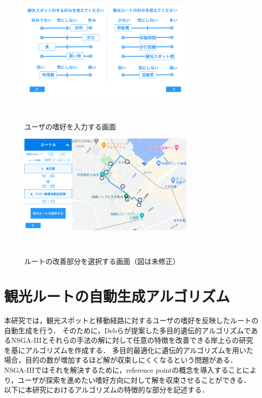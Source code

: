 \begin{figure}[h]
  \begin{center}
  \includegraphics[width=8.5cm,bb=0 0 1980 1080]{sysimage2.png}
  \end{center}
  \caption{ユーザの嗜好を入力する画面}　
  \label{fig:ユーザの嗜好を入力する画面}
\end{figure}

\begin{figure}[h]
  \begin{center}
  \includegraphics[width=8.5cm,bb=0 0 1980 1080]{sysimage1.png}
  \end{center}
  \caption{ルートの改善部分を選択する画面（図は未修正）}　
  \label{fig:ルートの改善部分を選択する画面}
\end{figure}

\section{観光ルートの自動生成アルゴリズム}\label{sec:観光ルート自動生成アルゴリズム}
本研究では，観光スポットと移動経路に対するユーザの嗜好を反映したルートの自動生成を行う．
そのために，Debらが提案した多目的遺伝的アルゴリズムであるNSGA-I\hspace{-.1em}I\hspace{-.1em}I\cite{NSGA3}とそれらの手法の解に対して任意の特徴を改善できる岸上らの研究\cite{岸上}を基にアルゴリズムを作成する．
多目的最適化に遺伝的アルゴリズムを用いた場合，目的の数が増加するほど解が収束しにくくなるという問題がある．
NSGA-I\hspace{-.1em}I\hspace{-.1em}Iではそれを解決するために，reference pointの概念を導入することにより，ユーザが探索を進めたい嗜好方向に対して解を収束させることができる．
以下に本研究におけるアルゴリズムの特徴的な部分を記述する．
